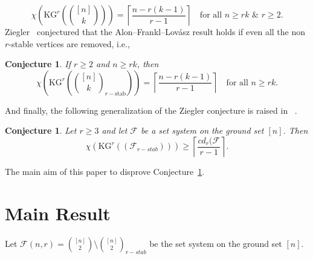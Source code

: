 \documentclass[preprint,12pt,3p]{elsarticle}
\newtheorem{conjecture}[theorem]{Conjecture}
\begin{document}
$$
\chi \left({\textrm{KG}}^{r}\left(\binom{[n]}{k}\right)\right)=\left\lceil\frac{n-r(k-1)}{r-1}\right\rceil\quad\text{for all}\,\, n\geq rk\,\,\&\,\, r\geq 2.
$$
Ziegler~\cite{ziegler2002generalized} conjectured that the Alon--Frankl--Lov\'{a}sz result holds if even all the non $r$-stable vertices are removed, i.e.,
\begin{conjecture}\label{Conj: zig}
If $r\geq 2$ and $n\geq rk$, then
$$\chi \left(\textrm{KG}^r\left(\binom{[n]}{k}_{r-\text{stab}}\right)\right)=\left\lceil\frac{n-r(k-1)}{r-1}\right\rceil\quad\text{for all}\,\, n\geq rk.$$
\end{conjecture}



And finally, the following generalization of the Ziegler conjecture is raised in ~\cite{frick2020chromatic}.
\begin{conjecture}
\label{Conj: Florian}
 Let $r\geq 3$ and let $\mathcal{F}$ be a set system on the ground set $[n]$. Then
 $$\chi\left(\textrm{KG}^r\left(\left(\mathcal{F}_{r-stab}\right)\right)\right)\geq\left\lceil\frac{cd_r(\mathcal{F}}{r-1}\right\rceil.$$
\end{conjecture}


The main aim of this paper to disprove Conjecture~\ref{Conj: Florian}. 


\section{Main Result}
Let $\mathcal{F}(n,r)=\binom{[n]}{2}\setminus\binom{[n]}{2}_{r-stab}$ be the set system on the ground set $[n]$.
\end{document}
